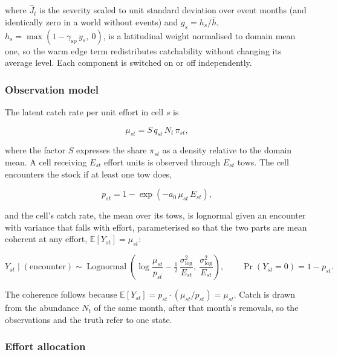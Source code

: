 \documentclass[
  11pt,
  a4paper,
]{article}
\begin{document}
\noindent where \(\hat{J}_t\) is the severity scaled to unit standard deviation
over event months (and identically zero in a world without events) and
\(g_s = h_s / \bar{h}\),
\(h_s = \max(1 - \gamma_{\text{sp}}\,y_s,\ 0)\), is a latitudinal weight
normalised to domain mean one, so the warm edge term redistributes
catchability without changing its average level. Each component is
switched on or off independently.

\hypertarget{observation-model}{%
\subsubsection{Observation model}\label{observation-model}}

The latent catch rate per unit effort in cell \(s\) is

\begin{equation}
\mu_{st} = S\,q_{st}\,N_t\,\pi_{st},
\end{equation}

\noindent where the factor \(S\) expresses the share \(\pi_{st}\) as a density
relative to the domain mean. A cell receiving \(E_{st}\) effort units is
observed through \(E_{st}\) tows. The cell encounters the stock if at
least one tow does,

\begin{equation}
p_{st} = 1 - \exp\!\left(-a_0\,\mu_{st}\,E_{st}\right),
\end{equation}

\noindent and the cell's catch rate, the mean over its tows, is lognormal given an
encounter with variance that falls with effort, parameterised so that
the two parts are mean coherent at any effort,
\(\mathbb{E}[Y_{st}] = \mu_{st}\):

\begin{equation}
Y_{st} \mid (\text{encounter}) \sim \operatorname{Lognormal}\!\left(\log\frac{\mu_{st}}{p_{st}} - \tfrac{1}{2}\,\frac{\sigma_{\log}^2}{E_{st}},\ \frac{\sigma_{\log}^2}{E_{st}}\right), \qquad \Pr(Y_{st} = 0) = 1 - p_{st}.
\end{equation}

\noindent The coherence follows because
\(\mathbb{E}[Y_{st}] = p_{st}\cdot(\mu_{st}/p_{st}) = \mu_{st}\). Catch
is drawn from the abundance \(N_t\) of the same month, after that
month's removals, so the observations and the truth refer to one state.

\hypertarget{effort-allocation}{%
\subsubsection{Effort allocation}\label{effort-allocation}}
\end{document}
